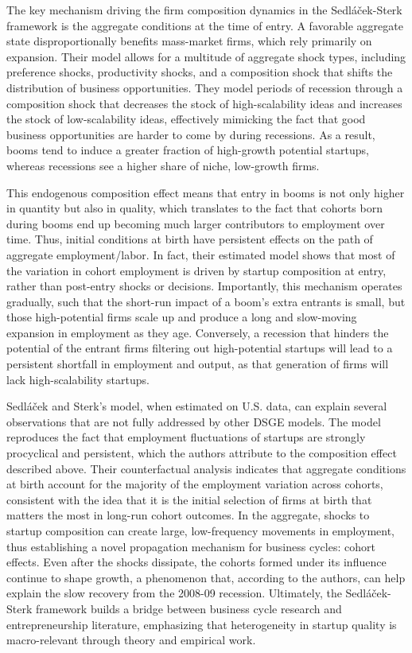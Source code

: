 \documentclass[a4paper,12pt]{article} %
\numberwithin{equation}{section} %
\numberwithin{figure}{section}
\numberwithin{table}{section}
\begin{document}
The key mechanism driving the firm composition dynamics in the Sedláček-Sterk framework is the aggregate conditions at the time of entry. 
A favorable aggregate state disproportionally benefits mass-market firms, which rely primarily on expansion. 
Their model allows for a multitude of aggregate shock types, including preference shocks, productivity shocks, and a composition shock that shifts the distribution of business opportunities. 
They model periods of recession through a composition shock that decreases the stock of high-scalability ideas and increases the stock of 
low-scalability ideas, effectively mimicking the fact that good business opportunities are harder to come by during recessions. As a result, 
booms tend to induce a greater fraction of high-growth potential startups, whereas recessions see a higher share of niche, low-growth firms. 

This endogenous composition effect means that entry in booms is not only higher in quantity but also in quality, which translates to the 
fact that cohorts born during booms end up becoming much larger contributors to employment over time. Thus, initial conditions at birth 
have persistent effects on the path of aggregate employment/labor. In fact, their estimated model shows that most of the variation in 
cohort employment is driven by startup composition at entry, rather than post-entry shocks or decisions. Importantly, this mechanism 
operates gradually, such that the short-run impact of a boom's extra entrants is small, but those high-potential firms scale up and 
produce a long and slow-moving expansion in employment as they age. Conversely, a recession that hinders the potential of the entrant 
firms filtering out high-potential startups will lead to a persistent shortfall in employment and output, as that generation of firms will lack 
high-scalability startups.

Sedláček and Sterk’s model, when estimated on U.S. data, can explain several observations that are not fully addressed by other DSGE models. 
The model reproduces the fact that employment fluctuations of startups are strongly procyclical and persistent, which the authors 
attribute to the composition effect described above. Their counterfactual analysis indicates that aggregate conditions at birth 
account for the majority of the employment variation across cohorts, consistent with the idea that it is the initial selection of 
firms at birth that matters the most in long-run cohort outcomes. In the aggregate, shocks to startup composition can create large, 
low-frequency movements in employment, thus establishing a novel propagation mechanism for business cycles: cohort effects. 
Even after the shocks dissipate, the cohorts formed under its influence continue to shape growth, a phenomenon that, according to the 
authors, can help explain the slow recovery from the 2008-09 recession. Ultimately, the Sedláček-Sterk framework builds a bridge 
between business cycle research and entrepreneurship literature, emphasizing that heterogeneity in startup quality is 
macro-relevant through theory and empirical work.
\end{document}
